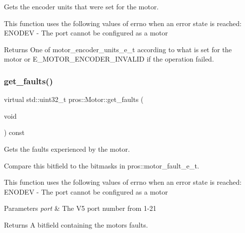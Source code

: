 Gets the encoder units that were set for the motor. 

This function uses the following values of errno when an error state is reached\+: E\+N\+O\+D\+EV -\/ The port cannot be configured as a motor

\begin{DoxyReturn}{Returns}
One of motor\+\_\+encoder\+\_\+units\+\_\+e\+\_\+t according to what is set for the motor or E\+\_\+\+M\+O\+T\+O\+R\+\_\+\+E\+N\+C\+O\+D\+E\+R\+\_\+\+I\+N\+V\+A\+L\+ID if the operation failed. 
\end{DoxyReturn}
\mbox{\label{classpros_1_1Motor_a66c6f6420485059af301a9c8a99b2045}} 
\subsubsection{\texorpdfstring{get\+\_\+faults()}{get\_faults()}}
{\footnotesize\ttfamily virtual std\+::uint32\+\_\+t pros\+::\+Motor\+::get\+\_\+faults (\begin{DoxyParamCaption}\item[{void}]{ }\end{DoxyParamCaption}) const\hspace{0.3cm}{\ttfamily [virtual]}}



Gets the faults experienced by the motor. 

Compare this bitfield to the bitmasks in pros\+::motor\+\_\+fault\+\_\+e\+\_\+t.

This function uses the following values of errno when an error state is reached\+: E\+N\+O\+D\+EV -\/ The port cannot be configured as a motor


\begin{DoxyParams}{Parameters}
{\em port} & The V5 port number from 1-\/21\\
\hline
\end{DoxyParams}
\begin{DoxyReturn}{Returns}
A bitfield containing the motor\textquotesingle{}s faults. 
\end{DoxyReturn}
\mbox{\label{classpros_1_1Motor_a7e24aa1c4363a131829e902f12e7364c}} 
